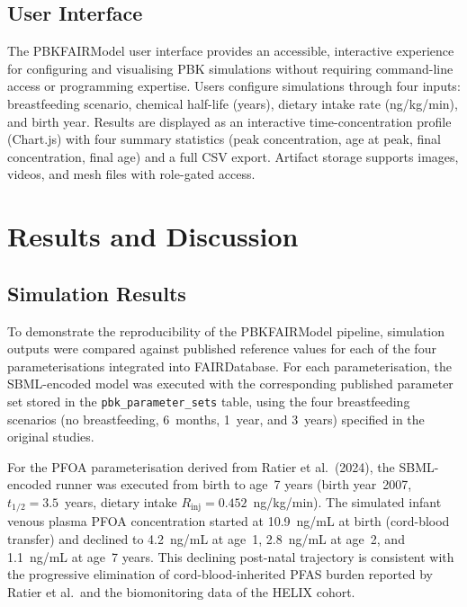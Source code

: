 \documentclass[preprint,12pt]{elsarticle}
\begin{document}
\begin{linenumbers}
\subsection{User Interface}\label{sec:ui}

The PBKFAIRModel user interface provides an accessible, interactive
experience for configuring and visualising PBK simulations without
requiring command-line access or programming expertise. Users configure
simulations through four inputs: breastfeeding scenario, chemical
half-life (years), dietary intake rate (ng/kg/min), and birth year.
Results are displayed as an interactive time-concentration profile
(Chart.js) with four summary statistics (peak concentration, age at
peak, final concentration, final age) and a full CSV export. Artifact
storage supports images, videos, and mesh files with role-gated access.

\section{Results and Discussion}\label{sec3}

\subsection{Simulation Results} %

To demonstrate the reproducibility of the PBKFAIRModel pipeline, simulation outputs were compared against published reference values for each of the four parameterisations integrated into FAIRDatabase. For each parameterisation, the SBML-encoded model was executed with the corresponding published parameter set stored in the \texttt{pbk\_parameter\_sets} table, using the four breastfeeding scenarios (no breastfeeding, 6~months, 1~year, and 3~years) specified in the original studies.

For the PFOA parameterisation derived from Ratier et al.\ (2024), the SBML-encoded runner was executed from birth to age~7 years (birth year~2007, $t_{1/2}=3.5$~years, dietary intake $R_{\mathrm{inj}}=0.452$~ng/kg/min). The simulated infant venous plasma PFOA concentration started at 10.9~ng/mL at birth (cord-blood transfer) and declined to 4.2~ng/mL at age~1, 2.8~ng/mL at age~2, and 1.1~ng/mL at age~7 years. This declining post-natal trajectory is consistent with the progressive elimination of cord-blood-inherited PFAS burden reported by Ratier et al.\ and the biomonitoring data of the HELIX cohort.


\end{linenumbers}
\end{document}
